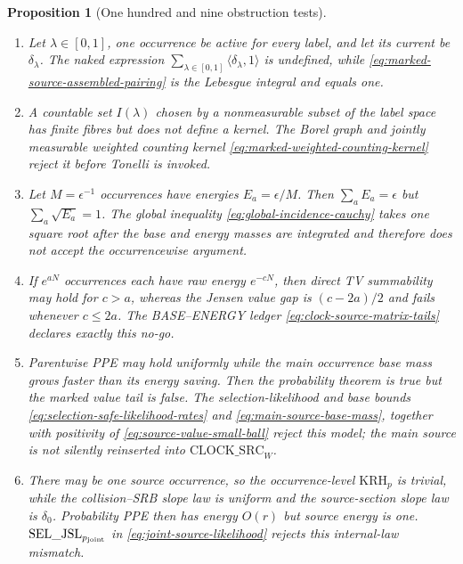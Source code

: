 \documentclass[11pt]{article}
\newtheorem{proposition}[theorem]{Proposition}
\begin{document}
\begin{proposition}[One hundred and nine obstruction tests]
\begin{enumerate}[label=\textup{(T\arabic*)}]
      from a probability first-hit partition.  The canonical owner map in
      Definition~\ref{def:source-incidence-space} identifies physical
      occurrences, not event supports, and therefore retains both.
\item Let $\lambda\in[0,1]$, one occurrence be active for every label, and
      let its current be $\delta_\lambda$.  The naked expression
      $\sum_{\lambda\in[0,1]}\langle\delta_\lambda,1\rangle$ is undefined,
      while \eqref{eq:marked-source-assembled-pairing} is the Lebesgue
      integral and equals one.
\item A countable set $I(\lambda)$ chosen by a nonmeasurable subset of the
      label space has finite fibres but does not define a kernel.  The Borel
      graph and jointly measurable weighted counting kernel
      \eqref{eq:marked-weighted-counting-kernel} reject it before Tonelli is
      invoked.
\item Let $M=\epsilon^{-1}$ occurrences have energies
      $E_a=\epsilon/M$.  Then $\sum_aE_a=\epsilon$ but
      $\sum_a\sqrt{E_a}=1$.  The global inequality
      \eqref{eq:global-incidence-cauchy} takes one square root after the base
      and energy masses are integrated and therefore does not accept the
      occurrencewise argument.
\item If $e^{aN}$ occurrences each have raw energy $e^{-cN}$, then direct TV
      summability may hold for $c>a$, whereas the Jensen value gap is
      $(c-2a)/2$ and fails whenever $c\le2a$.  The BASE--ENERGY ledger
      \eqref{eq:clock-source-matrix-tails} declares exactly this no-go.
\item Parentwise PPE may hold uniformly while the main occurrence base mass
      grows faster than its energy saving.  Then the probability theorem is
      true but the marked value tail is false.  The selection-likelihood and
      base bounds \eqref{eq:selection-safe-likelihood-rates} and
      \eqref{eq:main-source-base-mass}, together with positivity of
      \eqref{eq:source-value-small-ball} reject this model; the main source
      is not silently reinserted into $\mathrm{CLOCK\_SRC}_{W}$.
\item There may be one source occurrence, so the occurrence-level
      $\mathrm{KRH}_p$ is trivial, while the collision--SRB slope law is
      uniform and the source-section slope law is $\delta_0$.  Probability
      PPE then has energy $O(r)$ but source energy is one.
      $\mathrm{SEL\_JSL}_{p_{\rm joint}}$ in
      \eqref{eq:joint-source-likelihood} rejects this internal-law mismatch.

\end{enumerate}
\end{proposition}
\end{document}
